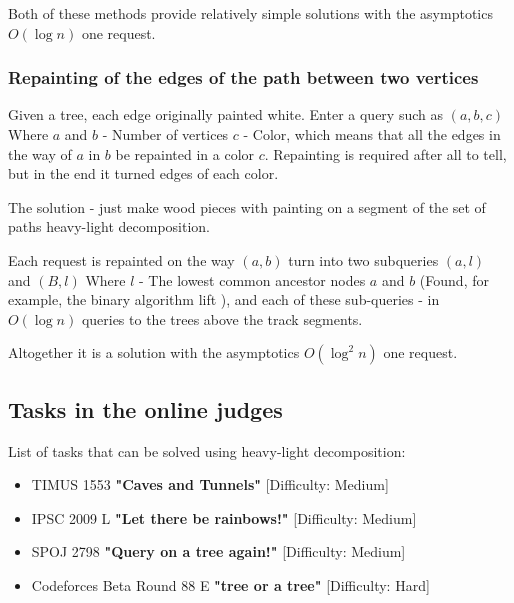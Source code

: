 Both of these methods provide relatively simple solutions with the asymptotics $O (\log n)$ one request.

\subsubsection{ Repainting of the edges of the path between two vertices }

Given a tree, each edge originally painted white. Enter a query such as $(a, b, c)$ Where $a$ and $b$ - Number of vertices $c$ - Color, which means that all the edges in the way of $a$ in $b$ be repainted in a color $c$. Repainting is required after all to tell, but in the end it turned edges of each color.

The solution - just make wood pieces with painting on a segment of the set of paths heavy-light decomposition.

Each request is repainted on the way $(a, b)$ turn into two subqueries $(a, l)$ and $(B, l)$ Where $l$ - The lowest common ancestor nodes $a$ and $b$ (Found, for example, the binary algorithm lift ), and each of these sub-queries - in $O (\log n)$ queries to the trees above the track segments.

Altogether it is a solution with the asymptotics $O (\log ^ 2 n)$ one request.

\subsection{ Tasks in the online judges }

List of tasks that can be solved using heavy-light decomposition:

\begin{itemize}

\item TIMUS 1553 \textbf{"Caves and Tunnels"} [Difficulty: Medium]

\item IPSC 2009 L \textbf{"Let there be rainbows!"} [Difficulty: Medium]

\item SPOJ 2798 \textbf{"Query on a tree again!"} [Difficulty: Medium]

\item Codeforces Beta Round 88 E \textbf{"tree or a tree"} [Difficulty: Hard]

\end{itemize}
